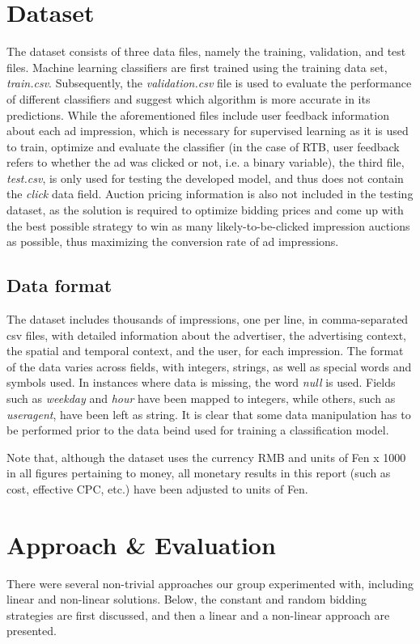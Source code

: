 \documentclass{sig-alternate-05-2015}
\begin{document}
\section{Dataset}
The dataset consists of three data files, namely the training, validation, and test files. Machine learning classifiers are first trained using the training data set, \textit{train.csv}. Subsequently, the \textit{validation.csv} file is used to evaluate the performance of different classifiers and suggest which algorithm is more accurate in its predictions. While the aforementioned files include user feedback information about each ad impression, which is necessary for supervised learning as it is used to train, optimize and evaluate the classifier (in the case of RTB, user feedback refers to whether the ad was clicked or not, i.e. a binary variable), the third file, \textit{test.csv}, is only used for testing the developed model, and thus does not contain the \textit{click} data field. Auction pricing information is also not included in the testing dataset, as the solution is required to optimize bidding prices and come up with the best possible strategy to win as many likely-to-be-clicked impression auctions as possible, thus maximizing the conversion rate of ad impressions.

\subsection{Data format}
The dataset includes thousands of impressions, one per line, in comma-separated csv files, with detailed information about the advertiser, the advertising context, the spatial and temporal context, and the user, for each impression. The format of the data varies across fields, with integers, strings, as well as special words and symbols used. In instances where data is missing, the word \textit{null} is used. Fields such as \textit{weekday} and \textit{hour} have been mapped to integers, while others, such as \textit{useragent}, have been left as string. It is clear that some data manipulation has to be performed prior to the data beind used for training a classification model.

Note that, although the dataset uses the currency RMB and units of Fen x 1000 in all figures pertaining to money, all monetary results in this report (such as cost, effective CPC, etc.) have been adjusted to units of Fen.

\section{Approach \& Evaluation}
There were several non-trivial approaches our group experimented with, including linear and non-linear solutions. Below, the constant and random bidding strategies are first discussed, and then a linear and a non-linear approach are presented.
\end{document}
